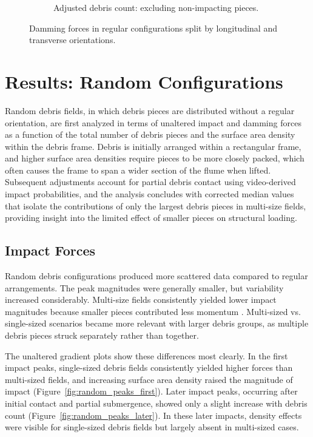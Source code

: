 \documentclass{article}
\begin{document}
\begin{figure}[htbp]
\begin{subfigure}[t]{0.9\textwidth}
        \caption{Adjusted debris count: excluding non-impacting pieces.}
        \label{fig:damming_regular_remap}
    \end{subfigure}
    \caption{Damming forces  in regular configurations split by longitudinal and transverse orientations.}
    \label{fig:damming_regular_split}
\end{figure}

\section{Results: Random Configurations}
Random debris fields, in which debris pieces are distributed without a regular orientation, are first analyzed in terms of unaltered impact and damming forces as a function of the total number of debris pieces and the surface area density within the debris frame. Debris is initially arranged within a rectangular frame, and higher surface area densities require pieces to be more closely packed, which often causes the frame to span a wider section of the flume when lifted. Subsequent adjustments account for partial debris contact using video-derived impact probabilities, and the analysis concludes with corrected median values that isolate the contributions of only the largest debris pieces in multi-size fields, providing insight into the limited effect of smaller pieces on structural loading.

\subsection{Impact Forces} 
Random debris configurations produced more scattered data compared to regular arrangements. The peak magnitudes were generally smaller, but variability increased considerably. Multi-size fields consistently yielded lower impact magnitudes because
smaller pieces contributed less momentum . Multi-sized vs. single-sized scenarios became more relevant with larger debris groups, as multiple debris pieces struck separately rather than together.

The unaltered gradient plots show these differences most clearly. In the first impact peaks, single-sized debris fields consistently yielded higher forces than multi-sized fields, and increasing surface area density raised the magnitude of impact (Figure~\ref{fig:random_peaks_first}). Later impact peaks, occurring after initial contact and partial submergence, showed only a slight increase with debris count (Figure~\ref{fig:random_peaks_later}). In these later impacts, density effects were visible for single-sized debris fields but largely absent in multi-sized cases.
\end{document}
